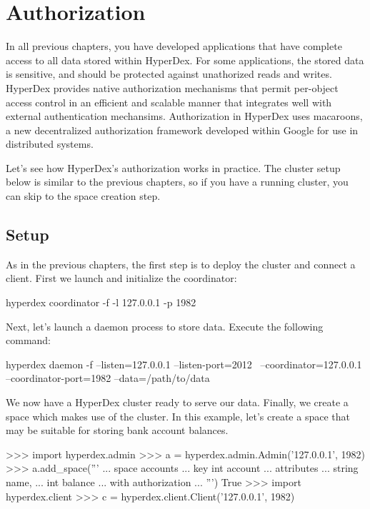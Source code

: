 \chapter{Authorization}
\label{chap:auth}

In all previous chapters, you have developed applications that have complete
access to all data stored within HyperDex.  For some applications, the stored
data is sensitive, and should be protected against unathorized reads and writes.
HyperDex provides native authorization mechanisms that permit per-object access
control in an efficient and scalable manner that integrates well with external
authentication mechansims.  Authorization in HyperDex uses macaroons, a new
decentralized authorization framework developed within Google for use in
distributed systems.

Let's see how HyperDex's authorization works in practice.  The cluster setup
below is similar to the previous chapters, so if you have a running cluster, you
can skip to the space creation step.

\section{Setup}
\label{sec:documents:setup}

As in the previous chapters, the first step is to deploy the cluster and connect
a client.   First we launch and initialize the coordinator:

\begin{consolecode}
hyperdex coordinator -f -l 127.0.0.1 -p 1982
\end{consolecode}

Next, let's launch a daemon process to store data.  Execute the following
command:

\begin{consolecode}
hyperdex daemon -f --listen=127.0.0.1 --listen-port=2012 \
                   --coordinator=127.0.0.1 --coordinator-port=1982 --data=/path/to/data
\end{consolecode}

We now have a HyperDex cluster ready to serve our data.  Finally, we create a
space which makes use of the cluster.  In this example, let's create a space
that may be suitable for storing bank account balances.

\begin{pythoncode}
>>> import hyperdex.admin
>>> a = hyperdex.admin.Admin('127.0.0.1', 1982)
>>> a.add_space('''
... space accounts
... key int account
... attributes
...    string name,
...    int balance
... with authorization
... ''')
True
>>> import hyperdex.client
>>> c = hyperdex.client.Client('127.0.0.1', 1982)
\end{pythoncode}

